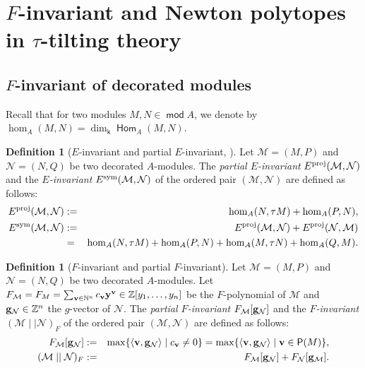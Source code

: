 \documentclass[10pt]{amsart}
\theoremstyle{definition}
\newtheorem{definition}[theorem]{Definition}
\theoremstyle{remark}
\numberwithin{equation}{section}
\def\mod{\opname{mod}\nolimits}
\newcommand{\opname}[1]{\operatorname{\mathsf{#1}}}
\newcommand{\Hom}{\opname{Hom}}
\begin{document}
\section{$F$-invariant and Newton polytopes in $\tau$-tilting theory}


\subsection{$F$-invariant of decorated modules} \label{sec:F-tau-tilting}


Recall that for two modules $M,N\in\mod A$, we denote by $\hom_A(M,N)=\dim_{\mathsf k}\Hom_A(M,N)$. 

 
\begin{definition}[$E$-invariant and partial $E$-invariant, \cite{DWZ10,DK-2015,air_2014}]
    Let $\mathcal M=(M,P)$ and $\mathcal N=(N,Q)$ be two decorated $A$-modules. The {\em partial $E$-invariant} $E^{\rm proj}(\mathcal M,\mathcal N)$ and the {\em $E$-invariant} $E^{\rm sym}(\mathcal M,\mathcal N)$ of the ordered pair $(\mathcal M,\mathcal N)$ are defined as follows:
\begin{eqnarray}
   E^{\rm proj}(\mathcal M,\mathcal N)&:=&\hom_A(N,\tau M)+\hom_A(P,N),\\
  E^{\rm sym}(\mathcal M,\mathcal N)&:=& E^{\rm proj}(\mathcal M,\mathcal N)+ E^{\rm proj}(\mathcal N,\mathcal M)\\
  &=&\hom_A(N,\tau M)+\hom_A(P,N)+\hom_A(M,\tau N)+\hom_A(Q,M).\nonumber
\end{eqnarray}

\end{definition}




\begin{definition}[$F$-invariant and partial $F$-invariant]
   Let $\mathcal M=(M,P)$ and $\mathcal N=(N,Q)$ be two decorated $A$-modules.  
   Let $F_{\mathcal M}=F_M=\sum_{{\bf v}\in\mathbb N^n}c_{\bf v}{\bf y}^{\bf v}\in\mathbb Z[y_1,\ldots,y_n]$ be the $F$-polynomial of $\mathcal M$ and
 ${\bf g}_{\mathcal N}\in\mathbb Z^n$ the $g$-vector of $\mathcal N$. The {\em partial $F$-invariant} $F_{\mathcal M}[{\bf g}_{\mathcal N}]$ and the {\em $F$-invariant} $(\mathcal M\mid\mid \mathcal N)_F$ of the ordered pair $(\mathcal M,\mathcal N)$ are defined as follows:
    \begin{eqnarray}
   F_{\mathcal M}[{\bf g}_{\mathcal N}]&:=&\max\{\langle {\bf v},{\bf g}_{\mathcal N}\rangle\mid c_{\bf v}\neq 0\}=\max\{\langle {\bf v},{\bf g}_{\mathcal N}\rangle\mid {\bf v}\in \mathsf P(M)\},\\
   (\mathcal M\mid\mid \mathcal N)_F&:=& F_{\mathcal M}[{\bf g}_{\mathcal N}]+ F_{\mathcal N}[{\bf g}_{\mathcal M}].
\end{eqnarray}
\end{definition}
\end{document}
